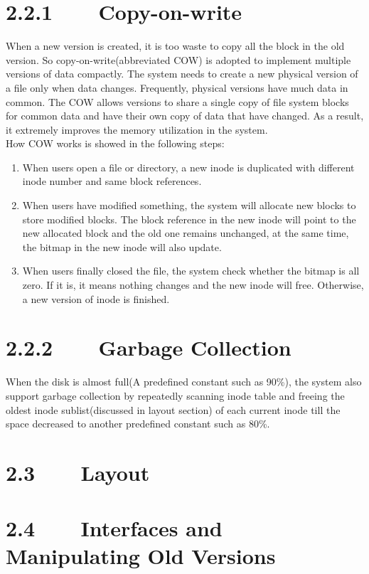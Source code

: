 \section*{2.2.1~~~~Copy-on-write}
When a new version is created, it is too waste to copy all the block in the old version. So copy-on-write(abbreviated COW) is adopted to implement multiple versions of data compactly. The system needs to create a new physical version of a file only when data changes. Frequently, physical versions have much data in common. The COW allows versions to share a single copy of file system blocks for common data and have their own copy of data that have changed. As a result, it extremely improves the memory utilization in the system.\\[1em]How COW works is showed in the following steps:
\begin{enumerate}
\item When users open a file or directory, a new inode is duplicated with different inode number and same block references.
\item When users have modified something, the system will allocate new blocks to store modified blocks. The block reference in the new inode will point to the new allocated block and the old one remains unchanged, at the same time, the bitmap in the new inode will also update. 
\item When users finally closed the file, the system check whether the bitmap is all zero. If it is, it means nothing changes and the new inode will free. Otherwise, a new version of inode is finished.
\end{enumerate}
\section*{2.2.2~~~~Garbage Collection} 
When the disk is almost full(A predefined constant such as 90\%), the system also support garbage collection by repeatedly scanning inode table and freeing the oldest inode sublist(discussed in layout section) of each current inode till the space decreased to another predefined constant such as 80\%.
\section*{2.3~~~~Layout}

\section*{2.4~~~~Interfaces and Manipulating Old Versions}
